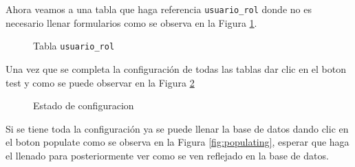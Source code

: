 Ahora veamos a una tabla que haga referencia \texttt{usuario\_rol} donde no es necesario llenar formularios como se observa en la Figura \ref{fillreferenced}.
\begin{figure}[H]
\caption{Tabla \texttt{usuario\_rol}}
\label{fillreferenced}
\centering
{}
\end{figure}
Una vez que se completa la configuraci\'on de todas las tablas dar clic en el boton test y como se puede observar en la Figura \ref{fig:statusConnection}
\begin{figure}[H]
\caption{Estado de configuracion}\label{fig:statusConnection}
\centering
{}
\end{figure}
 Si se tiene toda la configuraci\'on ya se puede llenar la base de datos dando clic en el boton populate como se observa en la Figura \ref{fig:populating}, esperar que haga el llenado para posteriormente ver como se ven reflejado en la base de datos.
 
